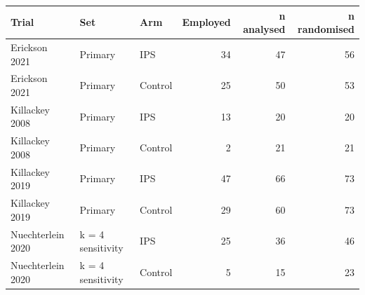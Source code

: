 
\begin{tabular}{lllrrr}
\toprule
Trial & Set & Arm & Employed & n analysed & n randomised\\
\midrule
Erickson 2021 & Primary & IPS & 34 & 47 & 56\\
Erickson 2021 & Primary & Control & 25 & 50 & 53\\
Killackey 2008 & Primary & IPS & 13 & 20 & 20\\
Killackey 2008 & Primary & Control & 2 & 21 & 21\\
Killackey 2019 & Primary & IPS & 47 & 66 & 73\\
Killackey 2019 & Primary & Control & 29 & 60 & 73\\
Nuechterlein 2020 & k = 4 sensitivity & IPS & 25 & 36 & 46\\
Nuechterlein 2020 & k = 4 sensitivity & Control & 5 & 15 & 23\\
\bottomrule
\end{tabular}
